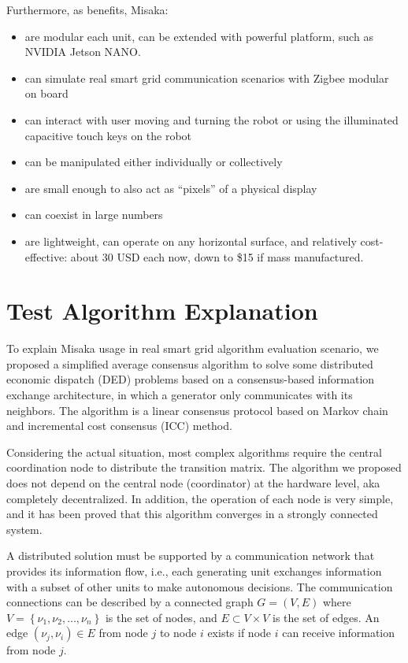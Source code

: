\documentclass[conference]{IEEEtran}
\begin{document}
Furthermore, as benefits, Misaka:

\begin{itemize}
    \item are modular each unit, can be extended with powerful platform, such as NVIDIA Jetson NANO.
    \item can simulate real smart grid communication scenarios with Zigbee modular on board
    \item can interact with user moving and turning the robot or using the illuminated capacitive touch keys on the robot 
    \item can be manipulated either individually or collectively
    \item are small enough to also act as “pixels” of a physical display
    \item can coexist in large numbers
    \item are lightweight, can operate on any horizontal surface, and relatively cost-effective: about 30 USD each now, down to \$15 if mass manufactured.
\end{itemize}

\section{Test Algorithm Explanation}
\label{sec:Algorithm}

To explain Misaka usage in real smart grid algorithm evaluation scenario, we proposed a simplified average consensus algorithm to solve some distributed economic dispatch (DED) problems based on a consensus-based information exchange architecture, in which a generator only communicates with its neighbors. The algorithm is a linear consensus protocol based on Markov chain and incremental cost consensus (ICC) method.

Considering the actual situation, most complex algorithms require the central coordination node to distribute the transition matrix. The algorithm we proposed does not depend on the central node (coordinator) at the hardware level, aka completely decentralized. In addition, the operation of each node is very simple, and it has been proved that this algorithm converges in a strongly connected system.

A distributed solution must be supported by a communication network that provides its information flow, i.e., each generating unit exchanges information with a subset of other units to make autonomous decisions\cite{binetti2013distributed}. The communication connections can be described by a connected graph $G=(V, E)$ where $V=\left\{\nu_{1}, \nu_{2}, \ldots, \nu_{n}\right\}$ is the set of nodes, and $E \subset V \times V$
is the set of edges. An edge $\left(\nu_{j}, \nu_{i}\right) \in E$ from node $j$ to node $i$ exists if node $i$ can receive information from node $j$.
\end{document}

